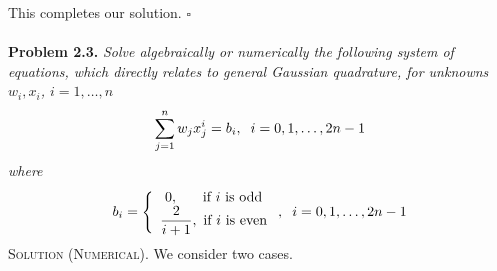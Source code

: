 \documentclass[a4paper]{article}
\numberwithin{equation}{section}
\begin{document}
This completes our solution. \hfill $\square$\\
\\
\textbf{Problem 2.3.} \textit{Solve algebraically or numerically the following system of equations, which directly relates to general Gaussian quadrature, for unknowns $w_i,x_i$, $i=1,\ldots,n$}
\begin{align}
\sum\limits_{j = 1}^n {{w_j}x_j^i}  = {b_i},\hspace{0.2cm}i = 0,1, \ldots ,2n - 1
\end{align}
\textit{where}
\begin{align}
b_i= \left\{ {\begin{array}{*{20}{c}}
{0,\hspace{0.5cm}\mbox{ if }i\mbox{ is odd}}\\
{\dfrac{2}{{i + 1}},\mbox{ if } i\mbox{ is even}}
\end{array}} \right.,\hspace{0.2cm} i = 0,1, \ldots ,2n - 1
\end{align}
\textsc{Solution (Numerical).} We consider two cases.
\end{document}
